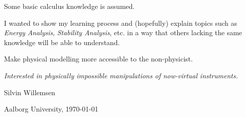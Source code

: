 Some basic calculus knowledge is assumed.  

I wanted to show my learning process and (hopefully) explain topics such as \textit{Energy Analysis}, \textit{Stability Analysis}, etc. in a way that others lacking the same knowledge %
will be able to understand.

Make physical modelling more accessible to the non-physicist.

\textit{Interested in physically impossible manipulations of now-virtual instruments.}

\vfill
\hfill Silvin Willemsen

\hfill Aalborg University, \today
